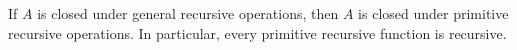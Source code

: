If $A$ is closed under general recursive operations, then $A$ is closed under primitive recursive operations. In particular, every primitive recursive function is recursive.
